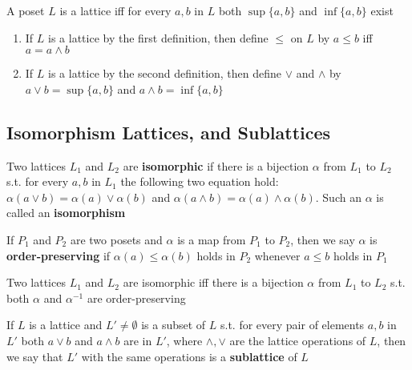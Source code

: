 \documentclass[11pt]{article}
\begin{document}
\begin{definition}[]
A poset \(L\) is a lattice iff for every \(a,b\) in \(L\) both \(\sup\{a,b\}\)
and \(\inf\{a,b\}\) exist
\end{definition}

\begin{enumerate}
\item If \(L\) is a lattice by the first definition, then define \(\le\) on \(L\)
by \(a\le b\) iff \(a=a\wedge b\)
\item If \(L\) is a lattice by the second definition, then define \(\vee\) and
\(\wedge\) by \(a\vee b=\sup\{a,b\}\) and \(a\wedge b=\inf\{a,b\}\)
\end{enumerate}


\subsection{Isomorphism Lattices, and Sublattices}
\label{sec:org1eadfc8}
\begin{definition}[]
Two lattices \(L_1\) and \(L_2\) are \textbf{isomorphic} if there is a bijection
\(\alpha\) from \(L_1\) to \(L_2\) s.t. for every \(a,b\) in \(L_1\) the following two
equation hold: \(\alpha(a\vee b)=\alpha(a)\vee\alpha(b)\) and 
\(\alpha(a\wedge b)=\alpha(a)\wedge\alpha(b)\). Such an \(\alpha\) is called an \textbf{isomorphism}
\end{definition}

\begin{definition}[]
If \(P_1\) and \(P_2\) are two posets and \(\alpha\) is a map from \(P_1\) to \(P_2\), then we
say \(\alpha\) is \textbf{order-preserving} if \(\alpha(a)\le\alpha(b)\) holds in \(P_2\) whenever
\(a\le b\) holds in \(P_1\)
\end{definition}

\begin{theorem}[]
Two lattices \(L_1\) and \(L_2\) are isomorphic iff there is a bijection \(\alpha\) from
\(L_1\) to \(L_2\) s.t. both \(\alpha\) and \(\alpha^{-1}\) are order-preserving
\end{theorem}

\begin{definition}[]
If \(L\) is a lattice and \(L'\neq\emptyset\) is a subset of \(L\) s.t. for every
pair of elements \(a,b\) in \(L'\) both \(a\vee b\) and \(a\wedge b\) are in
\(L'\), where \(\wedge,\vee\) are the lattice operations of \(L\), then we say
that \(L'\) with the same operations is a \textbf{sublattice} of \(L\)
\end{definition}
\end{document}
